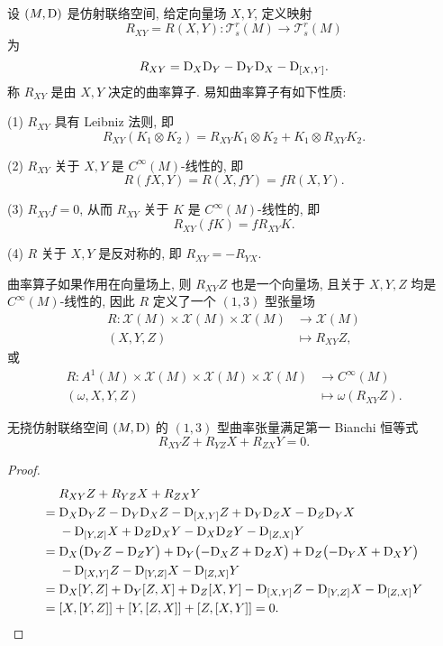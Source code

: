 设 $(M,\mathrm{D})$ 是仿射联络空间, 给定向量场 $X,Y$, 定义映射
\[R_{XY} = R(X,Y)\colon \mathscr{T}_s^r(M)\longrightarrow\mathscr{T}_s^r(M)\]
为
\[R_{XY} = \mathrm{D}_X\mathrm{D}_Y-\mathrm{D}_Y\mathrm{D}_X-\mathrm{D}_{[X,Y]}.\]
称 $R_{XY}$ 是由 $X,Y$ 决定的曲率算子. 易知曲率算子有如下性质:

(1) $R_{XY}$ 具有 Leibniz 法则, 即
\[R_{XY}(K_1\otimes K_2) = R_{XY}K_1\otimes K_2 + K_1\otimes R_{XY}K_2.\]

(2) $R_{XY}$ 关于 $X,Y$ 是 $C^{\infty}(M)$-线性的, 即
\[R(fX,Y) = R(X,fY) = fR(X,Y).\]

(3) $R_{XY}f=0$, 从而 $R_{XY}$ 关于 $K$ 是 $C^{\infty}(M)$-线性的, 即
\[R_{XY}(fK) = fR_{XY}K.\]

(4) $R$ 关于 $X,Y$ 是反对称的, 即 $R_{XY}=-R_{YX}$.

曲率算子如果作用在向量场上, 则 $R_{XY}Z$ 也是一个向量场, 且关于 $X,Y,Z$
均是 $C^{\infty}(M)$-线性的, 因此 $R$ 定义了一个 $(1,3)$ 型张量场
\begin{align*}
  R\colon \mathscr{X}(M)\times\mathscr{X}(M)\times\mathscr{X}(M) & \longrightarrow\mathscr{X}(M) \\
  (X,Y,Z) & \longmapsto R_{XY}Z,
\end{align*}
或
\begin{align*}
  R\colon A^1(M)\times\mathscr{X}(M)\times\mathscr{X}(M)\times\mathscr{X}(M)
  & \longrightarrow C^{\infty}(M) \\
  (\omega,X,Y,Z) & \longmapsto \omega(R_{XY}Z).
\end{align*}



\begin{theorem}
  无挠仿射联络空间 $(M,\mathrm{D})$ 的 $(1,3)$ 型曲率张量满足第一 Bianchi 恒等式
  \[R_{XY}Z + R_{YZ}X + R_{ZX}Y = 0.\]
\end{theorem}

\begin{proof}
  \begin{align*}
        & R_{XY}Z + R_{YZ}X + R_{ZX}Y \\
    ={} & \mathrm{D}_X\mathrm{D}_YZ - \mathrm{D}_Y\mathrm{D}_XZ - \mathrm{D}_{[X,Y]}Z + \mathrm{D}_Y\mathrm{D}_ZX - \mathrm{D}_Z\mathrm{D}_YX \\
        & - \mathrm{D}_{[Y,Z]}X + \mathrm{D}_Z\mathrm{D}_XY - \mathrm{D}_X\mathrm{D}_ZY - \mathrm{D}_{[Z,X]}Y \\
    ={} & \mathrm{D}_X\bigl(\mathrm{D}_YZ-\mathrm{D}_ZY\bigr) + \mathrm{D}_Y\bigl(-\mathrm{D}_XZ+\mathrm{D}_ZX\bigr) + \mathrm{D}_Z\bigl(-\mathrm{D}_YX+\mathrm{D}_XY\bigr) \\
        & - \mathrm{D}_{[X,Y]}Z - \mathrm{D}_{[Y,Z]}X - \mathrm{D}_{[Z,X]}Y \\
    ={} & \mathrm{D}_X[Y,Z] + \mathrm{D}_Y[Z,X] + \mathrm{D}_Z[X,Y] - \mathrm{D}_{[X,Y]}Z - \mathrm{D}_{[Y,Z]}X - \mathrm{D}_{[Z,X]}Y \\
    ={} & [X,[Y,Z]] + [Y,[Z,X]] + [Z,[X,Y]] = 0.\qedhere
  \end{align*}
\end{proof}

